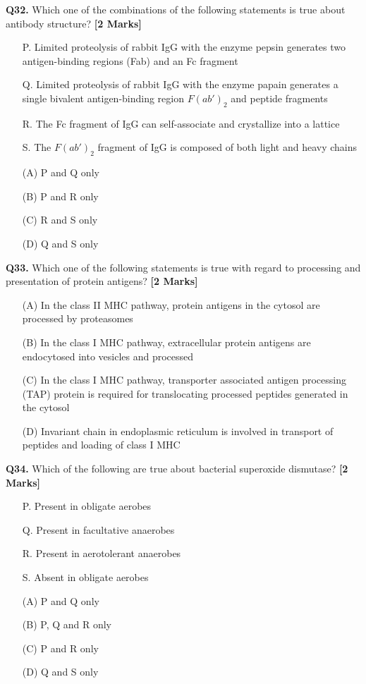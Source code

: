 \documentclass[11pt]{article}
\newcommand{\questionb}[2]{
    \noindent\textbf{Q#2.} #1 \hfill \textbf{[2 Marks]}
}
\begin{document}
\questionb{Which one of the combinations of the following statements is true about antibody structure?}{32}
\begin{enumerate}
    \item[P.] Limited proteolysis of rabbit IgG with the enzyme pepsin generates two antigen-binding regions (Fab) and an Fc fragment
    \item[Q.] Limited proteolysis of rabbit IgG with the enzyme papain generates a single bivalent antigen-binding region $F(ab')_2$ and peptide fragments
    \item[R.] The Fc fragment of IgG can self-associate and crystallize into a lattice
    \item[S.] The $F(ab')_2$ fragment of IgG is composed of both light and heavy chains
    \item[(A)] P and Q only
    \item[(B)] P and R only
    \item[(C)] R and S only
    \item[(D)] Q and S only
\end{enumerate}
\vspace{0.5cm}

\questionb{Which one of the following statements is true with regard to processing and presentation of protein antigens?}{33}
\begin{enumerate}
    \item[(A)] In the class II MHC pathway, protein antigens in the cytosol are processed by proteasomes
    \item[(B)] In the class I MHC pathway, extracellular protein antigens are endocytosed into vesicles and processed
    \item[(C)] In the class I MHC pathway, transporter associated antigen processing (TAP) protein is required for translocating processed peptides generated in the cytosol
    \item[(D)] Invariant chain in endoplasmic reticulum is involved in transport of peptides and loading of class I MHC
\end{enumerate}
\vspace{0.5cm}

\questionb{Which of the following are true about bacterial superoxide dismutase?}{34}
\begin{enumerate}
    \item[P.] Present in obligate aerobes
    \item[Q.] Present in facultative anaerobes
    \item[R.] Present in aerotolerant anaerobes
    \item[S.] Absent in obligate aerobes
    \item[(A)] P and Q only
    \item[(B)] P, Q and R only
    \item[(C)] P and R only
    \item[(D)] Q and S only
\end{enumerate}
\vspace{0.5cm}
\end{document}
